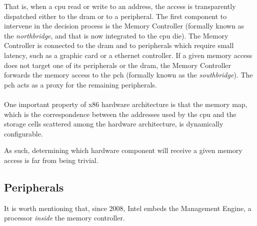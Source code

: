 That is, when a \ac{cpu} read or write to an address, the access is
transparently dispatched either to the \ac{dram} or to a peripheral.
%
The first component to intervene in the decision process is the Memory
Controller (formally known as the \emph{northbridge}, and that is now integrated
to the \ac{cpu} die).
%
The Memory Controller is connected to the \ac{dram} and to peripherals which
require small latency, such as a graphic card or a ethernet controller.
%
%
If a given memory access does not target one of its peripherals or the
\ac{dram}, the Memory Controller forwards the memory access to the \ac{pch}
(formally known as the \emph{southbridge}).
%
The \ac{pch} acts as a proxy for the remaining peripherals.

\paragraph{} 
%
One important property of x86 hardware architecture is that the memory map,
which is the correspondence between the addresses used by the \ac{cpu} and the
storage cells scattered among the hardware architecture, is dynamically
configurable.
%

As such, determining which hardware component will receive a given memory access
is far from being trivial.
%

\subsection{Peripherals}
\label{subsec:usecase:perif}

It is worth mentioning that, since 2008, Intel embeds the Management Engine, a
processor \emph{inside} the memory controller.

